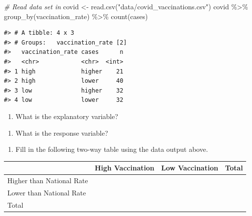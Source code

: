 \documentclass[
]{report}
\newenvironment{Shaded}{\begin{snugshade}}{\end{snugshade}}
\newcommand{\CommentTok}[1]{\textcolor[rgb]{0.56,0.35,0.01}{\textit{#1}}}
\newcommand{\FunctionTok}[1]{\textcolor[rgb]{0.00,0.00,0.00}{#1}}
\newcommand{\NormalTok}[1]{#1}
\newcommand{\OtherTok}[1]{\textcolor[rgb]{0.56,0.35,0.01}{#1}}
\newcommand{\SpecialCharTok}[1]{\textcolor[rgb]{0.00,0.00,0.00}{#1}}
\newcommand{\StringTok}[1]{\textcolor[rgb]{0.31,0.60,0.02}{#1}}
\providecommand{\tightlist}{%
  \setlength{\itemsep}{0pt}\setlength{\parskip}{0pt}}
\begin{document}
\begin{Shaded}
\begin{Highlighting}[]
\CommentTok{\# Read data set in}
\NormalTok{covid }\OtherTok{\textless{}{-}} \FunctionTok{read.csv}\NormalTok{(}\StringTok{"data/covid\_vaccinations.csv"}\NormalTok{) }
\NormalTok{covid }\SpecialCharTok{\%\textgreater{}\%} \FunctionTok{group\_by}\NormalTok{(vaccination\_rate) }\SpecialCharTok{\%\textgreater{}\%} \FunctionTok{count}\NormalTok{(cases)}
\end{Highlighting}
\end{Shaded}

\begin{verbatim}
#> # A tibble: 4 x 3
#> # Groups:   vaccination_rate [2]
#>   vaccination_rate cases      n
#>   <chr>            <chr>  <int>
#> 1 high             higher    21
#> 2 high             lower     40
#> 3 low              higher    32
#> 4 low              lower     32
\end{verbatim}

\begin{enumerate}
\def\labelenumi{\arabic{enumi}.}
\tightlist
\item
  What is the explanatory variable?
\end{enumerate}

\vspace{0.5in}

\begin{enumerate}
\def\labelenumi{\arabic{enumi}.}
\setcounter{enumi}{1}
\tightlist
\item
  What is the response variable?
\end{enumerate}

\vspace{0.5in}

\begin{enumerate}
\def\labelenumi{\arabic{enumi}.}
\setcounter{enumi}{2}
\tightlist
\item
  Fill in the following two-way table using the data output above.
\end{enumerate}

\begin{longtable}[]{@{}llll@{}}
\toprule
& High Vaccination & Low Vaccination & Total \\
\midrule
\endhead
Higher than National Rate & & & \\
Lower than National Rate & & & \\
Total & & & \\
\bottomrule
\end{longtable}
\end{document}

